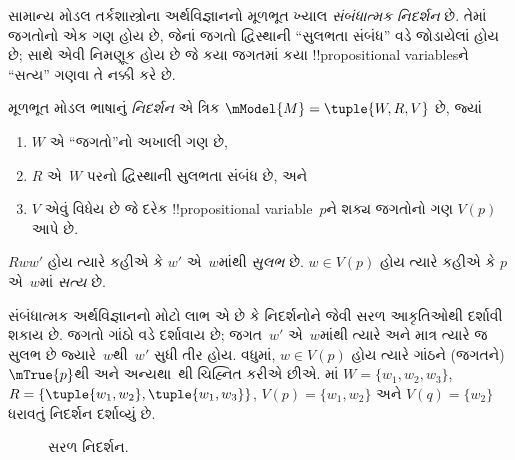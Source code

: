 \documentclass[../../../include/open-logic-section]{subfiles}
\begin{document}


સામાન્ય મોડલ તર્કશાસ્ત્રોના અર્થવિજ્ઞાનનો મૂળભૂત ખ્યાલ
\emph{સંબંધાત્મક નિદર્શન} છે. તેમાં જગતોનો એક ગણ હોય છે,
જેનાં જગતો દ્વિસ્થાની ``સુલભતા સંબંધ'' વડે જોડાયેલાં હોય છે;
સાથે એવી નિમણૂક હોય છે જે કયા જગતમાં કયા
!!{propositional variable}sને ``સત્ય'' ગણવા તે નક્કી કરે છે.

\begin{defn}
  મૂળભૂત મોડલ ભાષાનું \emph{નિદર્શન} એ ત્રિક
  $\mModel{M} = \tuple{W, R, V}$ છે, જ્યાં
  \begin{enumerate}
  \item $W$ એ ``જગતો''નો અખાલી ગણ છે,
  \item $R$ એ~$W$ પરનો દ્વિસ્થાની સુલભતા સંબંધ છે, અને
  \item $V$ એવું વિધેય છે જે દરેક !!{propositional
    variable}~$p$ને શક્ય જગતોનો ગણ $V(p)$ આપે છે.
  \end{enumerate}
  $Rww'$ હોય ત્યારે કહીએ કે $w'$ એ~$w$માંથી \emph{સુલભ}
  છે. $w \in V(p)$ હોય ત્યારે કહીએ કે $p$ એ~$w$માં
  \emph{સત્ય} છે.
\end{defn}

સંબંધાત્મક અર્થવિજ્ઞાનનો મોટો લાભ એ છે કે નિદર્શનોને
 જેવી સરળ આકૃતિઓથી દર્શાવી શકાય છે.
જગતો ગાંઠો વડે દર્શાવાય છે; જગત~$w'$ એ~$w$માંથી
ત્યારે અને માત્ર ત્યારે જ સુલભ છે જ્યારે~$w$થી~$w'$
સુધી તીર હોય. વધુમાં, $w \in V(p)$ હોય ત્યારે ગાંઠને
(જગતને)~$\mTrue{p}$થી અને અન્યથા~થી
ચિહ્નિત કરીએ છીએ. માં
$W = \{w_1, w_2, w_3\}$, $R = \{\tuple{w_1, w_2},\tuple{w_1,
  w_3}\}$, $V(p) = \{w_1, w_2\}$ અને $V(q) = \{w_2\}$
ધરાવતું નિદર્શન દર્શાવ્યું છે.

\begin{figure}
  \begin{center}
  \end{center}
  \caption{સરળ નિદર્શન.}
\end{figure}
\end{document}
